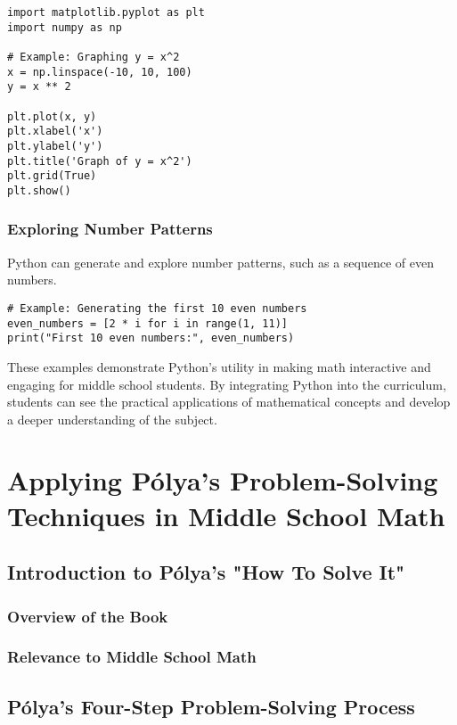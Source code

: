 \documentclass{book}
\begin{document}
\begin{lstlisting}[style=pythonstyle]
import matplotlib.pyplot as plt
import numpy as np

# Example: Graphing y = x^2
x = np.linspace(-10, 10, 100)
y = x ** 2

plt.plot(x, y)
plt.xlabel('x')
plt.ylabel('y')
plt.title('Graph of y = x^2')
plt.grid(True)
plt.show()
\end{lstlisting}

\subsection{Exploring Number Patterns}
Python can generate and explore number patterns, such as a sequence of even numbers.

\begin{lstlisting}[style=pythonstyle]
# Example: Generating the first 10 even numbers
even_numbers = [2 * i for i in range(1, 11)]
print("First 10 even numbers:", even_numbers)
\end{lstlisting}

These examples demonstrate Python's utility in making math interactive and engaging for middle school students. By integrating Python into the curriculum, students can see the practical applications of mathematical concepts and develop a deeper understanding of the subject.






\chapter{Applying Pólya's Problem-Solving Techniques in Middle School Math}


\section{Introduction to Pólya's "How To Solve It"}
\subsection{Overview of the Book}
\subsection{Relevance to Middle School Math}


\section{Pólya's Four-Step Problem-Solving Process}
\end{document}
